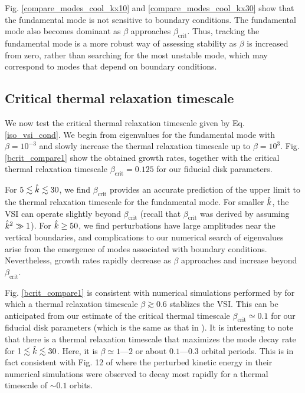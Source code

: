 Fig. \ref{compare_modes_cool_kx10} and \ref{compare_modes_cool_kx30} 
show that the fundamental mode is not sensitive to boundary
conditions. The fundamental mode also becomes dominant as $\beta$
approaches $\beta_\mathrm{crit}$.  
Thus, tracking the fundamental mode is a more robust way of 
assessing stability as $\beta$ is increased from zero, rather than
searching for the most unstable mode, which may correspond to modes
that depend on boundary conditions.  

\subsection{Critical thermal relaxation
  timescale}\label{bcrit_num_test}
We now test the critical thermal relaxation timescale given by
Eq. \ref{iso_vsi_cond}. We begin from eigenvalues for the fundamental
mode with $\beta=10^{-3}$ and slowly increase the thermal
relaxation timescale up to $\beta=10^3$. Fig. \ref{bcrit_compare1}
show the obtained growth rates, together with the critical  
thermal relaxation timescale $\beta_\mathrm{crit}=0.125$ for our
fiducial disk parameters.   

For $5\lesssim\hat{k}\lesssim30$, we find $\beta_\mathrm{crit}$ provides
an accurate prediction of the upper limit to the thermal relaxation 
timescale for the fundamental mode. For smaller $\hat{k}$, the VSI can
operate slightly beyond $\beta_\mathrm{crit}$ (recall that
$\beta_\mathrm{crit}$ was derived by assuming $\hat{k}^2\gg 1$). For
$\hat{k}\geq 50$, we find perturbations have large amplitudes near the
 vertical boundaries, and 
complications to our numerical search of
eigenvalues arise from the emergence of modes associated with boundary
conditions. Nevertheless, growth rates rapidly decrease as $\beta$
approaches and increase beyond $\beta_\mathrm{crit}$.  

Fig. \ref{bcrit_compare1} is consistent with numerical simulations
performed by \cite{nelson13} for which a thermal relaxation timescale
$\beta\gtrsim 0.6$ stablizes the VSI. This can be anticipated from our
estimate of the critical thermal timescale $\beta_\mathrm{crit}\simeq
0.1$ for our fiducial disk parameters (which is the same as that in
\citeauthor{nelson13}). It is interesting to note that there is a
thermal relaxation timescale that maximizes the mode decay rate for
$1\lesssim \hat{k} \lesssim 30$. Here, it is $\beta\simeq1$---$2$ or
about $0.1$---$0.3$ orbital periods. This is in fact consistent with 
Fig. 12 of \citeauthor{nelson13} where the perturbed kinetic energy in their
numerical simulations were observed to decay most rapidly for a
thermal timescale of $\sim 0.1$ orbits.     

